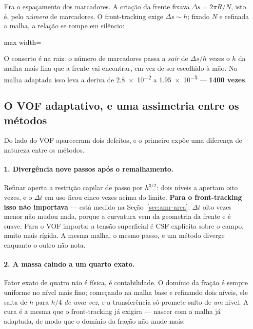 Era o espa\c{c}amento dos marcadores. A cria\c{c}\~ao da frente fixava
$\Delta s = 2\pi R/N$, isto \'e, pelo \emph{n\'umero} de marcadores. O
front-tracking exige $\Delta s \sim h$; fixado $N$ e refinada a malha, a rela\c{c}\~ao
se rompe em sil\^encio:

\begin{adjustbox}{max width=\linewidth}
\end{adjustbox}

O conserto \'e na raiz: o n\'umero de marcadores passa a \emph{sair} de
$\Delta s/h$ vezes o $h$ da malha mais fina que a frente vai encontrar, em vez de
ser escolhido \`a m\~ao. Na malha adaptada isso leva a deriva de \num{2.8e-2} a
\num{1.95e-5} --- \textbf{1400 vezes}.

\subsection{O VOF adaptativo, e uma assimetria entre os m\'etodos}

Do lado do VOF apareceram dois defeitos, e o primeiro exp\~oe uma diferen\c{c}a
de natureza entre os m\'etodos.

\paragraph{1. Diverg\^encia nove passos ap\'os o remalhamento.} Refinar aperta a
restri\c{c}\~ao capilar de passo por $h^{3/2}$: dois n\'iveis a apertam oito
vezes, e o $\Delta t$ em uso ficou cinco vezes acima do limite. \textbf{Para o
front-tracking isso n\~ao importava} --- est\'a medido na
Se\c{c}\~ao~\ref{sec:amr-area}: $\Delta t$ oito vezes menor n\~ao mudou nada,
porque a curvatura vem da geometria da frente e \'e suave. Para o VOF importa: a
tens\~ao superficial \'e CSF expl\'icita sobre o campo, muito mais r\'igida. A
mesma malha, o mesmo passo, e um m\'etodo diverge enquanto o outro n\~ao nota.

\paragraph{2. A massa caindo a um quarto exato.} Fator exato de quatro n\~ao \'e
f\'isica, \'e contabilidade. O dom\'inio da fra\c{c}\~ao \'e sempre uniforme no
n\'ivel mais fino; come\c{c}ando na malha base e refinando dois n\'iveis, ele
salta de $h$ para $h/4$ \emph{de uma vez}, e a transfer\^encia s\'o promete salto
de \emph{um} n\'ivel. A cura \'e a mesma que o front-tracking j\'a exigira ---
nascer com a malha j\'a adaptada, de modo que o dom\'inio da fra\c{c}\~ao n\~ao
mude mais:

